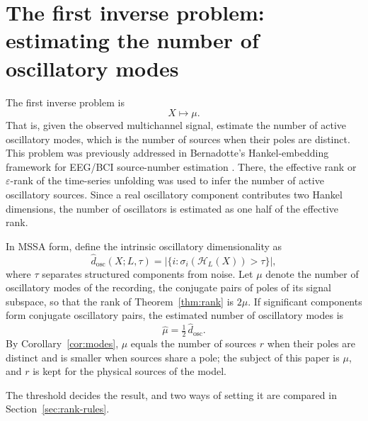 \documentclass{article}
\begin{document}
\section{The first inverse problem: estimating the number of oscillatory modes}\label{sec:first-inverse-problem-estimating}

The first inverse problem is \[
X \longmapsto \mu .
\] That is, given the observed multichannel signal, estimate the number of active oscillatory modes, which is the number of sources when their poles are distinct. This problem was previously addressed in Bernadotte's Hankel-embedding framework for EEG/BCI source-number estimation \cite{ref-BernadotteBuchstaber, ref-Bernadotte05}. There, the effective rank or $\varepsilon$-rank of the time-series unfolding was used to infer the number of active oscillatory sources. Since a real oscillatory component contributes two Hankel dimensions, the number of oscillators is estimated as one half of the effective rank.

In MSSA form, define the intrinsic oscillatory dimensionality \cite{ref-Bernadotte07} as 
\begin{equation} \label{eq:dosc}
\widehat{d}_{\mathrm{osc}}(X; L, \tau) = \bigl|\{ i : \sigma_i(\mathcal{H}_L(X)) > \tau \}\bigr|,
\end{equation} where $\tau$ separates structured components from noise. Let $\mu$ denote the number of oscillatory modes of the recording, the conjugate pairs of poles of its signal subspace, so that the rank of Theorem~\ref{thm:rank} is $2\mu$. If significant components form conjugate oscillatory pairs, the estimated number of oscillatory modes is \[
\widehat{\mu} = \tfrac{1}{2}\, \widehat{d}_{\mathrm{osc}} .
\] By Corollary~\ref{cor:modes}, $\mu$ equals the number of sources $r$ when their poles are distinct and is smaller when sources share a pole; the subject of this paper is $\mu$, and $r$ is kept for the physical sources of the model.

The threshold decides the result, and two ways of setting it are compared in Section~\ref{sec:rank-rules}.
\end{document}
